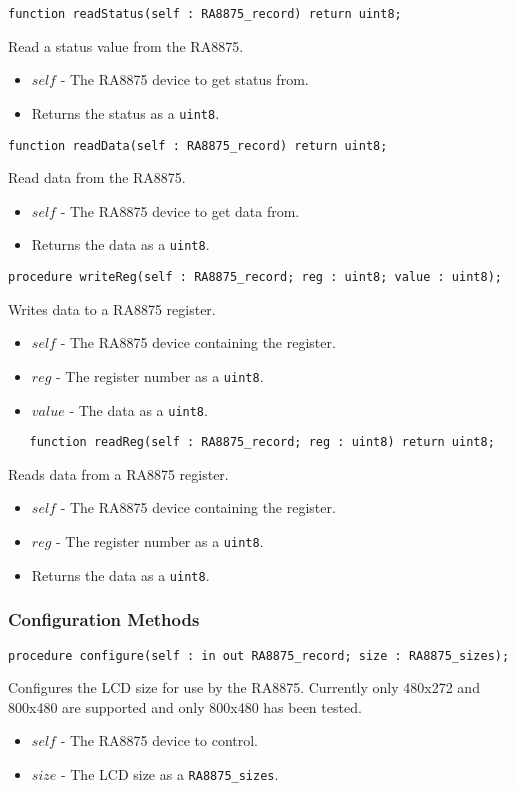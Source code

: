 \documentclass[10pt, openany]{book}
\newcommand{\datatype}[1]{\texttt{#1}}
\begin{document}
\begin{lstlisting}
function readStatus(self : RA8875_record) return uint8;
\end{lstlisting}
Read a status value from the RA8875.
\begin{itemize}
  \item $self$ - The RA8875 device to get status from.
  \item Returns the status as a \datatype{uint8}.
\end{itemize}

\begin{lstlisting}
function readData(self : RA8875_record) return uint8;
\end{lstlisting}
Read data from the RA8875.
\begin{itemize}
  \item $self$ - The RA8875 device to get data from.
  \item Returns the data as a \datatype{uint8}.
\end{itemize}

\begin{lstlisting}
procedure writeReg(self : RA8875_record; reg : uint8; value : uint8);
\end{lstlisting}
Writes data to a RA8875 register.
\begin{itemize}
  \item $self$ - The RA8875 device containing the register.
  \item $reg$ - The register number as a \datatype{uint8}.
  \item $value$ - The data as a \datatype{uint8}.
\end{itemize}

\begin{lstlisting}
   function readReg(self : RA8875_record; reg : uint8) return uint8;
\end{lstlisting}
Reads data from a RA8875 register.
\begin{itemize}
  \item $self$ - The RA8875 device containing the register.
  \item $reg$ - The register number as a \datatype{uint8}.
  \item Returns the data as a \datatype{uint8}.
\end{itemize}

\subsubsection{Configuration Methods}
\begin{lstlisting}
procedure configure(self : in out RA8875_record; size : RA8875_sizes);
\end{lstlisting}
Configures the LCD size for use by the RA8875.  Currently only 480x272 and 800x480 are supported and only 800x480 has been tested.
\begin{itemize}
  \item $self$ - The RA8875 device to control.
  \item $size$ - The LCD size as a \datatype{RA8875\_sizes}.
\end{itemize}
\end{document}
